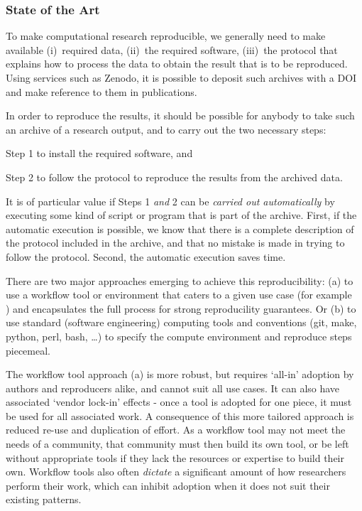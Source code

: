 \subsubsection{State of the Art}

To make computational research reproducible, we generally need to make available
(i)~required data, (ii)~the required software, (iii)~the protocol that explains
how to process the data to obtain the result that is to be reproduced. Using
services such as Zenodo, it is possible to deposit such archives with a DOI and
make reference to them in publications.

In order to reproduce the results, it should be possible for anybody to take such an archive of a research
output, and to carry out the two necessary steps:
\begin{compactitem}
\item Step 1 to install the required software, and
\item Step 2 to follow the protocol to reproduce the results from the archived data.
\end{compactitem}

It is of particular value if Steps 1 \emph{and} 2 can be \emph{carried out
  automatically} by executing some kind of script or program that is part of the
archive. First, if the automatic execution is possible, we know that there is a
complete description of the protocol included in the archive, and that no
mistake is made in trying to follow the protocol. Second, the automatic
execution saves time.

There are two major approaches emerging to achieve this reproducibility: (a) to use a
workflow tool or environment that caters to a given use case (for example
~\cite{reana2019} )
and encapsulates the full process for strong reproducility guarantees.
Or (b) to use standard (software engineering) computing tools and conventions
(git, make, python, perl, bash, \ldots)
to specify the compute environment and reproduce steps piecemeal.

The workflow tool approach (a) is more robust, but requires `all-in' adoption by authors and reproducers alike,
and cannot suit all use cases. It can also have associated `vendor lock-in' effects
- once a tool is adopted for one piece, it must be used for all associated work.
A consequence of this more tailored approach is reduced re-use and duplication of effort.
As a workflow tool may not meet the needs of a community,
that community must then build its own tool, or be left without appropriate tools
if they lack the resources or expertise to build their own.
Workflow tools also often \emph{dictate} a significant amount of how researchers perform their work,
which can inhibit adoption when it does not suit their existing patterns.

